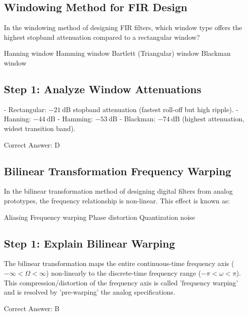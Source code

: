\clearpage

\subsection{Windowing Method for FIR Design}

In the windowing method of designing FIR filters, which window type offers the highest stopband attenuation compared to a rectangular window?

\begin{choices}
    \choice Hanning window
    \choice Hamming window
    \choice Bartlett (Triangular) window
    \correctchoice Blackman window
\end{choices}

\begin{solution}

\subsection*{Step 1: Analyze Window Attenuations}
- Rectangular: $-21\ \text{dB}$ stopband attenuation (fastest roll-off but high ripple).
- Hanning: $-44\ \text{dB}$
- Hamming: $-53\ \text{dB}$
- Blackman: $-74\ \text{dB}$ (highest attenuation, widest transition band).

Correct Answer: D
\end{solution}

\clearpage

\subsection{Bilinear Transformation Frequency Warping}

In the bilinear transformation method of designing digital filters from analog prototypes, the frequency relationship is non-linear. This effect is known as:

\begin{choices}
    \choice Aliasing
    \correctchoice Frequency warping
    \choice Phase distortion
    \choice Quantization noise
\end{choices}

\begin{solution}

\subsection*{Step 1: Explain Bilinear Warping}
The bilinear transformation maps the entire continuous-time frequency axis ($-\infty < \Omega < \infty$) non-linearly to the discrete-time frequency range ($-\pi < \omega < \pi$). This compression/distortion of the frequency axis is called 'frequency warping' and is resolved by 'pre-warping' the analog specifications.

Correct Answer: B
\end{solution}

